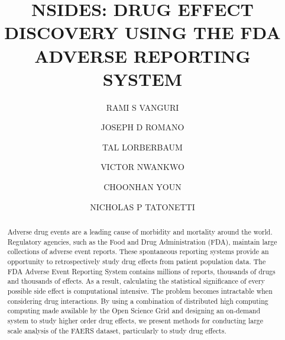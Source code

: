 \documentclass{ws-procs11x85}
\begin{document}
\title{NSIDES: DRUG EFFECT DISCOVERY USING THE FDA ADVERSE REPORTING SYSTEM}

\author{RAMI S VANGURI}

\address{Department of Biomedical Informatics, Columbia University,\\
New York, NY 10032 USA\\
E-mail: r.vanguri@columbia.edu}

\author{JOSEPH D ROMANO}

\address{Department of Biomedical Informatics, Columbia University,\\
New York, NY 10032 USA\\
E-mail: r.vanguri@columbia.edu}

\author{TAL LORBERBAUM}

\address{Department of Biomedical Informatics, Columbia University,\\
New York, NY 10032 USA\\
E-mail: r.vanguri@columbia.edu}

\author{VICTOR NWANKWO}

\address{Department of Biomedical Informatics, Columbia University,\\
New York, NY 10032 USA\\
E-mail: r.vanguri@columbia.edu}

\author{CHOONHAN YOUN}

\address{San Diego Supercomputer Center, University of California, San Diego,\\
La Jolla, CA 92093 USA\\
E-mail: cyoun@sdsc.edu}

\author{NICHOLAS P TATONETTI}

\address{Department of Biomedical Informatics, Columbia University,\\
New York, NY 10032 USA\\
E-mail: nick.tatonetti@columbia.edu}

\begin{abstract}
Adverse drug events are a leading cause of morbidity and mortality
around the world. Regulatory agencies, such as the Food and Drug
Administration (FDA), maintain large collections of adverse event
reports.  These spontaneous reporting systems provide an opportunity
to retrospectively study drug effects from patient population
data. The FDA Adverse Event Reporting System contains millions of
reports, thousands of drugs and thousands of effects.  As a result,
calculating the statistical significance of every possible side effect
is computational intensive.  The problem becomes intractable when
considering drug interactions. By using a combination of distributed
high computing computing made available by the Open Science Grid and
designing an on-demand system to study higher order drug effects, we
present methods for conducting large scale analysis of the FAERS
dataset, particularly to study drug effects.
\end{abstract}
\end{document}
